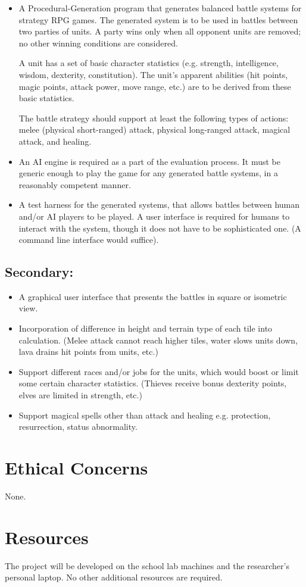 \documentclass[a4paper,11pt]{article}
\begin{document}
\begin{itemize}
	\item A Procedural-Generation program that generates balanced battle systems for strategy RPG games. The generated system is to be used in battles between two parties of units. A party wins only when all opponent units are removed; no other winning conditions are considered. 
	
	A unit has a set of basic character statistics (e.g. strength, intelligence, wisdom, dexterity, constitution). The unit's apparent abilities (hit points, magic points, attack power, move range, etc.) are to be derived from these basic statistics.
	
	The battle strategy should support at least the following types of actions: melee (physical short-ranged) attack, physical long-ranged attack, magical attack, and healing.
	
	\item An AI engine is required as a part of the evaluation process. It must be generic enough to play the game for any generated battle systems, in a reasonably competent manner.
	
	\item A test harness for the generated systems, that allows battles between human and/or AI players to be played. A user interface is required for humans to interact with the system, though it does not have to be sophisticated one. (A command line interface would suffice).
	
\end{itemize}

\subsection*{Secondary:}
	
\begin{itemize}
	\item A graphical user interface that presents the battles in square or isometric view.
	\item Incorporation of difference in height and terrain type of each tile into calculation. (Melee attack cannot reach higher tiles, water slows units down, lava  drains hit points from units, etc.)
	\item Support different races and/or jobs for the units, which would boost or limit some certain character statistics. (Thieves receive bonus dexterity points, elves are limited in strength, etc.)
	\item Support magical spells other than attack and healing e.g. protection, resurrection, status abnormality.
\end{itemize}

\section*{Ethical Concerns}

None.

\section*{Resources}

The project will be developed on the school lab machines and the researcher's personal laptop. No other additional resources are required.

\printbibliography
\end{document}
